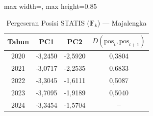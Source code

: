 \begin{table}[H]
\centering
\caption{Pergeseran Posisi STATIS ($\mathbf{F}_k$) --- Majalengka} \label{tab:app1jarak_statis_skor_majalengka}
\begin{adjustbox}{max width=\textwidth, max height=0.85\textheight}
\begin{tabular}{|c|c|c|c|}
\hline
\textbf{Tahun} & \textbf{PC1} & \textbf{PC2} & \textbf{$D(\text{pos}_t, \text{pos}_{t+1})$} \\
\hline
2020 & -3,2450 & -2,5920 & 0,3804 \\
2021 & -3,0717 & -2,2535 & 0,6833 \\
2022 & -3,3045 & -1,6111 & 0,5087 \\
2023 & -3,7095 & -1,9189 & 0,5040 \\
2024 & -3,3454 & -1,5704 & -- \\
\hline
\end{tabular}
\end{adjustbox}
\end{table}